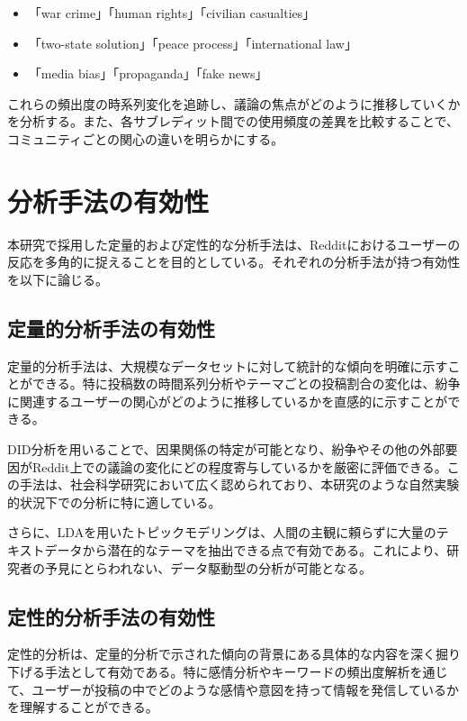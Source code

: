 \documentclass[11pt, a4j]{jreport}
\begin{document}
    \begin{itemize}
        \item 「war crime」「human rights」「civilian casualties」

        \item 「two-state solution」「peace process」「international law」

        \item 「media bias」「propaganda」「fake news」
    \end{itemize}

    これらの頻出度の時系列変化を追跡し、議論の焦点がどのように推移していくかを分析する。また、各サブレディット間での使用頻度の差異を比較することで、コミュニティごとの関心の違いを明らかにする。

    \section{分析手法の有効性}
    本研究で採用した定量的および定性的な分析手法は、Redditにおけるユーザーの反応を多角的に捉えることを目的としている。それぞれの分析手法が持つ有効性を以下に論じる。

    \subsection{定量的分析手法の有効性}
    定量的分析手法は、大規模なデータセットに対して統計的な傾向を明確に示すことができる。特に投稿数の時間系列分析やテーマごとの投稿割合の変化は、紛争に関連するユーザーの関心がどのように推移しているかを直感的に示すことができる。

    DID分析を用いることで、因果関係の特定が可能となり、紛争やその他の外部要因がReddit上での議論の変化にどの程度寄与しているかを厳密に評価できる。この手法は、社会科学研究において広く認められており、本研究のような自然実験的状況下での分析に特に適している。

    さらに、LDAを用いたトピックモデリングは、人間の主観に頼らずに大量のテキストデータから潜在的なテーマを抽出できる点で有効である。これにより、研究者の予見にとらわれない、データ駆動型の分析が可能となる。

    \subsection{定性的分析手法の有効性}
    定性的分析は、定量的分析で示された傾向の背景にある具体的な内容を深く掘り下げる手法として有効である。特に感情分析やキーワードの頻出度解析を通じて、ユーザーが投稿の中でどのような感情や意図を持って情報を発信しているかを理解することができる。
\end{document}
